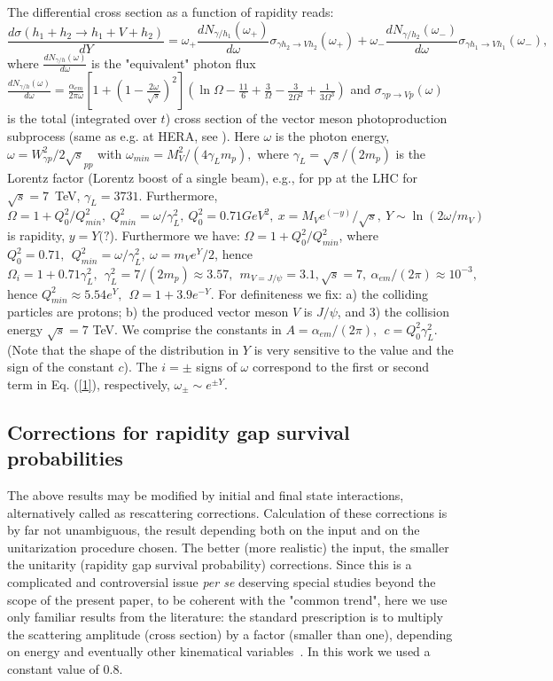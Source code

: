 \documentclass[12pt]{article}
\begin{document}
The differential cross section as a function of rapidity reads:
 \begin{equation}\label{1}
\frac{d\sigma (h_1+h_2\rightarrow h_1+V+h_2)}{dY}=\omega_+\frac{dN_{\gamma/h_1}(\omega_+)}{d\omega}\sigma_{\gamma h_2\rightarrow Vh_2}(\omega_+)+
\omega_-\frac{dN_{\gamma/h_2}(\omega_-)}{d\omega}\sigma_{\gamma h_1\rightarrow Vh_1}(\omega_-),
\end{equation}
where $\frac{dN_{\gamma/h}(\omega)}{d\omega}$ is the "equivalent" photon flux \cite{Review}
$\frac{dN_{\gamma/h}(\omega)}{d\omega}=\frac{\alpha_{em}}{2\pi\omega}[1+(1-\frac{2\omega}{\sqrt{s}})^2]
(\ln\Omega-\frac{11}{6}+\frac{3}{\Omega}-\frac{3}{2\Omega^2}+\frac{1}{3\Omega^3})$
and $\sigma_{\gamma p\rightarrow Vp}(\omega)$ is the total (integrated over $t$) cross section of the vector meson photoproduction subprocess (same as e.g. at HERA, see \cite{Capua, Fazio}). Here $\omega$ is the photon energy, $\omega=W^2_{\gamma p}/2\sqrt s_{pp}$ with
$\omega_{min}=M_V^2/(4\gamma_Lm_p),$ where $\gamma_L=\sqrt s/(2m_p)$
is the Lorentz factor (Lorentz boost of a single beam), e.g., for pp at the LHC for $\sqrt{s}=7$~TeV,
$\gamma_L=3731$.
Furthermore,
$\Omega=1+Q_0^2/Q_{min}^2,\  Q_{min}^2=\omega/\gamma_L^2,\   Q_0^2=0.71GeV^2,\   x=M_Ve^{(-y)}/\sqrt s,\  Y\sim\ln(2\omega/m_V)$ is rapidity, $y=Y(?$).
Furthermore we have: $\Omega=1+Q^2_0/Q^2_{min}$, where $Q_0^2=0.71,\ \ Q_{min}^2=\omega/\gamma^2_L,\ \omega=m_Ve^Y/2$, hence $\Omega_i=1+0.71\gamma_L^2,\ \ \gamma_L^2=7/(2m_p)\approx 3.57, \  \
m_{V=J/\psi}=3.1, \sqrt{s}=7, \ \alpha_{em}/(2\pi)\approx 10^{-3},$ hence $Q^2_{min}\approx 5.54e^Y,\ \ \Omega=1+3.9e^{-Y}$. For definiteness we fix: a) the colliding particles are protons;
b) the produced vector meson $V$ is $J/\psi$, and 3) the collision energy $\sqrt s=7$ TeV.
We comprise the constants in $A=\alpha_{em}/(2\pi),\ \  c=Q_0^2\gamma_L^2$.
(Note that the shape of the distribution in $Y$ is very sensitive to the value and the sign of the constant $c$).
The $i=\pm$ signs of $\omega$ correspond to the first or second term in Eq. (\ref{1}), respectively, $\omega_{\pm}\sim e^{\pm Y}$.

\subsection{Corrections for rapidity gap survival probabilities}\label{corrections}
The above results may be modified by initial and final state interactions,
alternatively called as rescattering corrections. Calculation of these
corrections is by far not unambiguous, the result depending both on the input
and on the unitarization procedure chosen. The better (more realistic) the input, the smaller the unitarity (rapidity gap survival probability) corrections.
Since this is a complicated and controversial issue {\it per se} deserving special studies beyond the scope of the present paper, to be coherent with the "common trend", here we use only familiar results from the literature:
the standard prescription is to multiply the scattering amplitude (cross section) by a factor (smaller than one), depending on energy and eventually other kinematical variables~\cite{Ryskin}.
In this work we used a constant value of 0.8.
\end{document}
